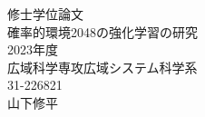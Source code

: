 \documentclass[11pt, dvipdfmx, openany]{jsbook}
\begin{document}
\begin{titlepage}
\begin{center}
    \vspace*{50truept}
    {\huge 修士学位論文}\\ %
    \vspace*{100truept}
    {\huge 確率的環境2048の強化学習の研究}\\ %
    \vspace{10truept}
    \vspace{120truept}
    {\huge 2023年度} \\
    \vspace{30truept}
    {\huge 広域科学専攻広域システム科学系} \\
    \vspace{30truept}
    {\huge 31-226821}\\ 
    \vspace{30truept}
    {\huge 山下修平}\\ 
    \vspace{50truept}
\end{center}
\end{titlepage}

\tableofcontents
\clearpage











\appendix

\end{document}
